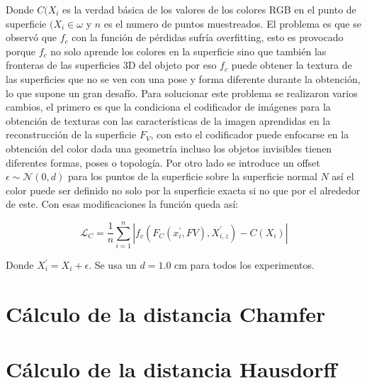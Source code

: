 Donde $C(X_{i}$ es la verdad básica de los valores de los colores RGB en el punto de superficie $(X_{i} \in \omega$ y $n$ es el numero de puntos muestreados. El problema es que se observó que $f_{c}$ con la función de pérdidas sufría overfitting, esto es provocado porque $f_{c}$ no solo aprende los colores en la superficie sino que también las fronteras de las superficies 3D del objeto por eso $f_{c}$ puede obtener la textura de las  superficies que no se ven con una pose y forma diferente durante la obtención, lo que supone un gran desafío. Para solucionar este problema se realizaron varios cambios, el primero es que la condiciona el codificador de imágenes para la obtención de texturas con las características de la imagen aprendidas en la reconstrucción de la superficie $F_{V}$, con esto el codificador puede enfocarse en la obtención del color dada una geometría incluso los objetos invisibles tienen diferentes formas, poses o topología. Por otro lado se introduce un offset $\epsilon \sim \mathcal{N}(0, d)$ para los puntos de la superficie sobre la superficie normal $N$ así el color puede ser definido no solo por la superficie exacta si no que por el alrededor de este. Con esas modificaciones la función queda así:

\begin{equation}
	\label{eq:5}
	\mathcal{L}_{C} = \frac{1}{n} 
	\sum_{i=1}^{n} | f_{c} (F_{C}(x_{i}^{'}, F{V}), X_{i,z}^{'}) - C(X_{i}) |
\end{equation}

Donde $ X_{i}^{'} = X_{i} + \epsilon$. Se usa un $d = 1.0$ cm para todos los experimentos.

\section{Cálculo de la distancia Chamfer}

\section{Cálculo de la distancia Hausdorff}

\clearpage
